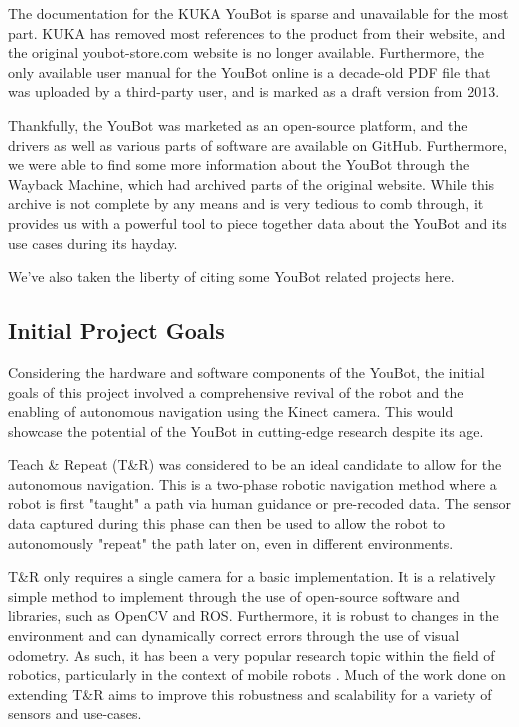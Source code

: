 \documentclass[a4paper, 12pt]{article}
\newif\ifshownotes
\newcommand{\notes}[1]{\ifshownotes\textcolor{blue}{#1}\fi}
\begin{document}
    The documentation for the KUKA YouBot is sparse and unavailable for the most part. KUKA has removed most references to the product from their website, and the original youbot-store.com website is no longer available. Furthermore, the only available user manual for the YouBot online is a decade-old PDF file that was uploaded by a third-party user, and is marked as a draft version from 2013. 

    Thankfully, the YouBot was marketed as an open-source platform, and the drivers as well as various parts of software are available on GitHub. Furthermore, we were able to find some more information about the YouBot through the Wayback Machine, which had archived parts of the original website. While this archive is not complete by any means and is very tedious to comb through, it provides us with a powerful tool to piece together data about the YouBot and its use cases during its hayday.

    We've also taken the liberty of citing some YouBot related projects here.

    \notes{add images of some of the more interesting websites here, and some of the images regarding the youbot's statistics.}
    \subsection{Initial Project Goals}

    Considering the hardware and software components of the YouBot, the initial goals of this project involved a comprehensive revival of the robot and the enabling of autonomous navigation using the Kinect camera. This would showcase the potential of the YouBot in cutting-edge research despite its age. 

    Teach \& Repeat (T\&R) was considered to be an ideal candidate to allow for the autonomous navigation. This\notes{[cite]} is a two-phase robotic navigation method where a robot is first "taught" a path via human guidance or pre-recoded data. The sensor data captured during this phase can then be used to allow the robot to autonomously "repeat" the path later on, even in different environments.

    T\&R only requires a single camera for a basic implementation. It is a relatively simple method to implement through the use of open-source software and libraries, such as OpenCV and ROS. Furthermore, it is robust to changes in the environment and can dynamically correct errors through the use of visual odometry. As such, it has been a very popular research topic within the field of robotics, particularly in the context of mobile robots \notes{[cite]}. Much of the work done on extending T\&R aims to improve this robustness and scalability for a variety of sensors and use-cases. 
\end{document}
